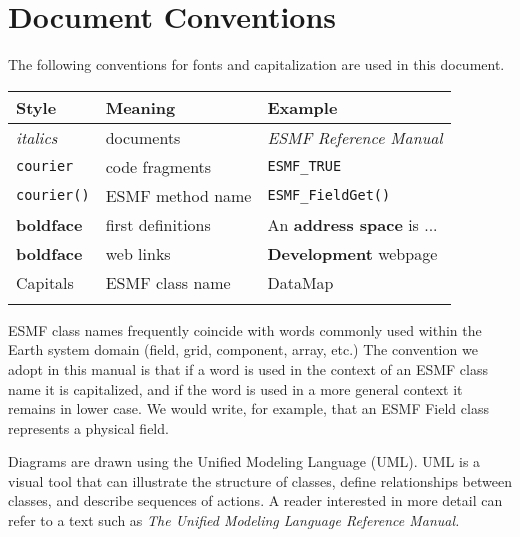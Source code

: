 \section{Document Conventions}
\label{sec:conventions}

The following conventions for fonts and capitalization are used
in this document. \newline

\begin{tabular}{lll}
{\bf Style} & {\bf Meaning} & {\bf Example} \\ \hline
{\it italics}  & documents & {\it ESMF Reference Manual}\\
{\tt courier}  & code fragments & {\tt ESMF\_TRUE}\\
{\tt courier()}  & ESMF method name & {\tt ESMF\_FieldGet()} \\
{\bf boldface} & first definitions & An {\bf address space} is ...\\
{\bf boldface} & web links & {\bf Development} webpage \\
{Capitals}     & ESMF class name & DataMap \\ \\
\end{tabular} 
 
ESMF class names frequently coincide with words commonly
used within the Earth system domain (field, grid, component, array, 
etc.)  The convention we adopt in this manual is that if a word is 
used in the context of an ESMF class name it is capitalized, and 
if the word is used in a more general context it remains in lower 
case.  We would write, for example, that an ESMF Field class 
represents a physical field.  

Diagrams are drawn using the Unified Modeling Language (UML).  UML is 
a visual tool that can illustrate the structure of 
classes, define relationships between classes, and describe sequences
of actions.  A reader interested in more detail can refer to a 
text such as {\it The Unified Modeling Language Reference Manual.}
 \cite{uml}





